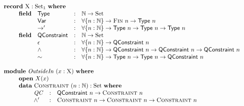 \documentclass[a4paper]{jfp}
\begin{document}
\begin{figure}[H]
\begin{displaymath}
   \begin{array}{l}
   \textbf{record}\ \textsc{X} : \text{Set}_1\ \textbf{where} \\ \qquad
   \begin{array}{llcl} 
   \textbf{field} & \textsf{Type} & : & \mathbb{N} \rightarrow \text{Set} \\ 
                  & \textsf{Var} & : & \forall \{ n : \mathbb{N} \} \rightarrow \textsc{Fin}\ n \rightarrow \textsf{Type}\ n \\
                  & \rightarrow' & : & \forall \{ n : \mathbb{N} \} \rightarrow \textsf{Type}\ n \rightarrow \textsf{Type}\ n 
                                                                    \rightarrow \textsf{Type} \ n \\
   \textbf{field} & \textsf{QConstraint} & : & \mathbb{N} \rightarrow \text{Set} \\
                  & \epsilon & : & \forall \{ n : \mathbb{N} \} \rightarrow \textsf{QConstraint}\ n \\
                  & \land & : & \forall \{ n : \mathbb{N} \} \rightarrow \textsf{QConstraint}\ n \rightarrow \textsf{QConstraint}\ n 
                                                             \rightarrow \textsf{QConstraint}\ n \\
                  & \sim & : &\forall \{ n : \mathbb{N} \} \rightarrow  \textsf{Type}\ n \rightarrow \textsf{Type}\ n 
                                                           \rightarrow  \textsf{QConstraint}\ n\\
   \end{array}\\\\
   \textbf{module}\ \mathit{OutsideIn}\ ( x : \textsc{X})\ \textbf{where} \\ \qquad 
	\begin{array}{l}
      \textbf{open}\  X(x)\\ 
		\textbf{data}\  \textsc{Constraint}\ (n :\mathbb{N}) : \text{Set}\ \textbf{where} \\ \qquad
		               \begin{array}{lcl}
                   \mathit{QC} & : &   \textsf{QConstraint}\ n \rightarrow \textsc{Constraint}\ n \\
						 \land'   & : & \textsc{Constraint}\ n \rightarrow \textsc{Constraint}\ n 
                                                              \rightarrow \textsc{Constraint}\ n \\

\end{array}
\end{array}
\end{array}
\end{displaymath}
\end{figure}
\end{document}
